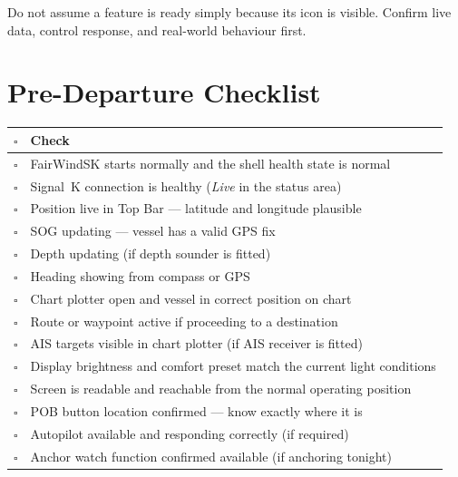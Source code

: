 \begin{warningbox}
Do not assume a feature is ready simply because its icon is visible.
Confirm live data, control response, and real-world behaviour first.
\end{warningbox}

\section{Pre-Departure Checklist}

\begin{longtable}{C{0.8cm}L{12.9cm}}
\toprule
{}
\color{white}\sffamily\bfseries $\square$ &
\color{white}\sffamily\bfseries Check \\
\midrule
$\square$ & FairWindSK starts normally and the shell health state is normal \\
$\square$ & Signal~K connection is healthy (\textit{Live} in the status area) \\
$\square$ & Position live in Top Bar --- latitude and longitude plausible \\
$\square$ & SOG updating --- vessel has a valid GPS fix \\
$\square$ & Depth updating (if depth sounder is fitted) \\
$\square$ & Heading showing from compass or GPS \\
$\square$ & Chart plotter open and vessel in correct position on chart \\
$\square$ & Route or waypoint active if proceeding to a destination \\
$\square$ & AIS targets visible in chart plotter (if AIS receiver is fitted) \\
$\square$ & Display brightness and comfort preset match the current light conditions \\
$\square$ & Screen is readable and reachable from the normal operating position \\
$\square$ & POB button location confirmed --- know exactly where it is \\
$\square$ & Autopilot available and responding correctly (if required) \\
$\square$ & Anchor watch function confirmed available (if anchoring tonight) \\
\bottomrule
\end{longtable}
